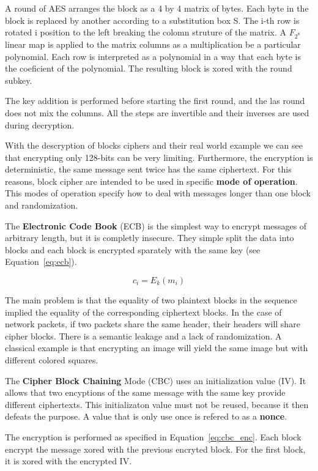 A round of AES arranges the block as a 4 by 4 matrix of bytes.
Each byte in the block is replaced by another according to a substitution box S.
The i-th row is rotated i position to the left breaking the colomn struture of the matrix.
A $F_{2^8}$ linear map is applied to the matrix columns as a multiplication be a particular polynomial.
Each row is interpreted as a polynomial in a way that each byte is the coeficient of the polynomial.
The resulting block is xored with the round subkey.

The key addition is performed before starting the first round, and the las round does not mix the columns.
All the steps are invertible and their inverses are used during decryption.

With the descryption of blocks ciphers and their real world example we can see that encrypting only 128-bits can be very limiting.
Furthermore, the encryption is deterministic, the same message sent twice has the same ciphertext.
For this reasons, block cipher are intended to be used in specific \textbf{mode of operation}.
This modes of operation specify how to deal with messages longer than one block and randomization.

The \textbf{Electronic Code Book} (ECB) is the simplest way to encrypt messages of arbitrary length, but it is completly insecure.
They simple split the data into blocks and each block is encrypted sparately with the same key (see Equation~\ref{eq:ecb}).

\begin{equation}
  c_i = E_k(m_i)
  \label{eq:ecb}
\end{equation}

The main problem is that the equality of two plaintext blocks in the sequence implied the equality of the corresponding ciphertext blocks.
In the case of network packets, if two packets share the same header, their headers will share cipher blocks.
There is a semantic leakage and a lack of randomization.
A classical example is that encrypting an image will yield the same image but with different colored squares.

The \textbf{Cipher Block Chaining} Mode (CBC) uses an initialization value (IV).
It allows that two encyptions of the same message with the same key provide different ciphertexts.
This initializaton value must not be reused, because it then defeats the purpose.
A value that is only use once is refered to as a \textbf{nonce}.

The encryption is performed as specified in Equation~\ref{eq:cbc_enc}.
Each block encrypt the message xored with the previous encryted block.
For the first block, it is xored with the encrypted IV.

